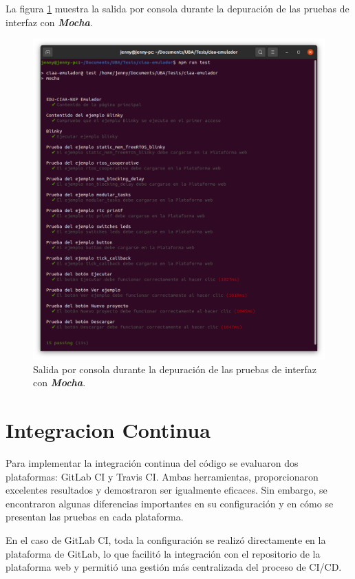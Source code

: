 La figura \ref{fig:TestVS1} muestra la salida por consola durante la depuración de las pruebas de interfaz con \textit{\textbf{Mocha}}.


\begin{figure}[ht]
	\centering
	\includegraphics[scale=.29]{./Figures/TestInterfaz.png}
	\caption{Salida por consola durante la depuración de las pruebas de interfaz con \textit{\textbf{Mocha}}.}
	\label{fig:TestVS1}
\end{figure}

\section{Integracion Continua}
\label{sec:Integracion Continua}

Para implementar la integración continua del código se evaluaron dos plataformas: GitLab CI y Travis CI. Ambas herramientas, proporcionaron excelentes resultados y demostraron ser igualmente eficaces. Sin embargo, se encontraron algunas diferencias importantes en su configuración y en cómo se presentan las pruebas en cada plataforma.

En el caso de GitLab CI, toda la configuración se realizó directamente en la plataforma de GitLab, lo que facilitó la integración con el repositorio de la plataforma web y permitió una gestión más centralizada del proceso de CI/CD.

